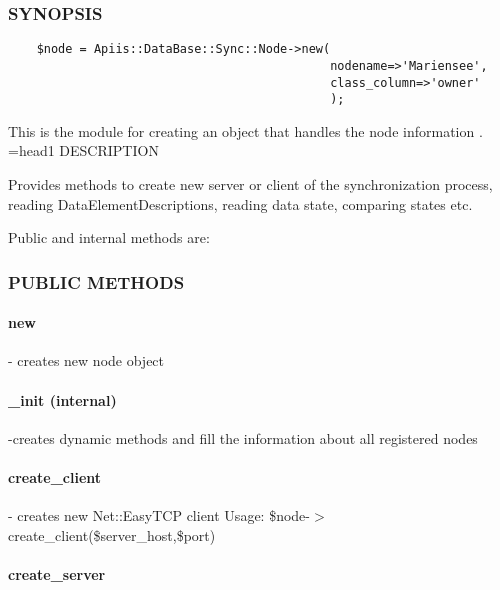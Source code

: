 \subsubsection{SYNOPSIS\label{SYNOPSIS}}
\begin{verbatim}
    $node = Apiis::DataBase::Sync::Node->new(
                                             nodename=>'Mariensee',
                                             class_column=>'owner'
                                             );
\end{verbatim}


This is the module for creating an object that handles the node information . 
=head1 DESCRIPTION



Provides methods to create new server or client of the synchronization process, reading DataElementDescriptions, reading data state, comparing states etc.



Public and internal methods are:

\subsubsection{PUBLIC METHODS\label{PUBLIC_METHODS}}
\paragraph*{new\label{new}}


- creates new node object

\paragraph*{\_init (internal)\label{_init_internal_}}


-creates dynamic methods and fill the information about all registered nodes

\paragraph*{create\_client\label{create_client}}


- creates new Net::EasyTCP client
Usage: \$node-$>$create\_client(\$server\_host,\$port)

\paragraph*{create\_server\label{create_server}}


